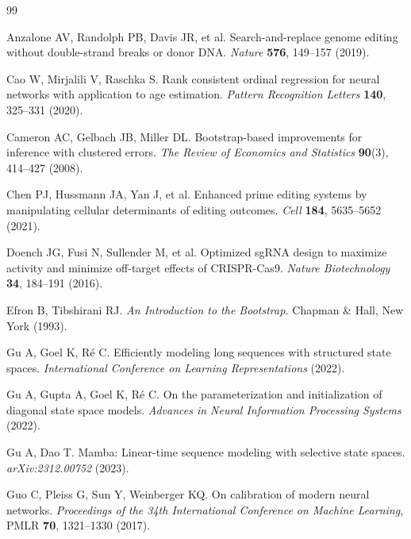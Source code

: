 \documentclass[11pt]{article}
\begin{document}
\begin{thebibliography}{99}\small

Anzalone AV, Randolph PB, Davis JR, et al.
Search-and-replace genome editing without double-strand breaks or donor DNA.
\emph{Nature} \textbf{576}, 149--157 (2019).

Cao W, Mirjalili V, Raschka S.
Rank consistent ordinal regression for neural networks with application to age
estimation. \emph{Pattern Recognition Letters} \textbf{140}, 325--331 (2020).

Cameron AC, Gelbach JB, Miller DL.
Bootstrap-based improvements for inference with clustered errors.
\emph{The Review of Economics and Statistics} \textbf{90}(3), 414--427 (2008).

Chen PJ, Hussmann JA, Yan J, et al.
Enhanced prime editing systems by manipulating cellular determinants of editing
outcomes. \emph{Cell} \textbf{184}, 5635--5652 (2021).

Doench JG, Fusi N, Sullender M, et al.
Optimized sgRNA design to maximize activity and minimize off-target effects of
CRISPR-Cas9. \emph{Nature Biotechnology} \textbf{34}, 184--191 (2016).

Efron B, Tibshirani RJ.
\emph{An Introduction to the Bootstrap.} Chapman \& Hall, New York (1993).

Gu A, Goel K, R\'e C.
Efficiently modeling long sequences with structured state spaces.
\emph{International Conference on Learning Representations} (2022).

Gu A, Gupta A, Goel K, R\'e C.
On the parameterization and initialization of diagonal state space models.
\emph{Advances in Neural Information Processing Systems} (2022).

Gu A, Dao T.
Mamba: Linear-time sequence modeling with selective state spaces.
\emph{arXiv:2312.00752} (2023).

Guo C, Pleiss G, Sun Y, Weinberger KQ.
On calibration of modern neural networks.
\emph{Proceedings of the 34th International Conference on Machine Learning},
PMLR \textbf{70}, 1321--1330 (2017).


\end{thebibliography}
\end{document}
